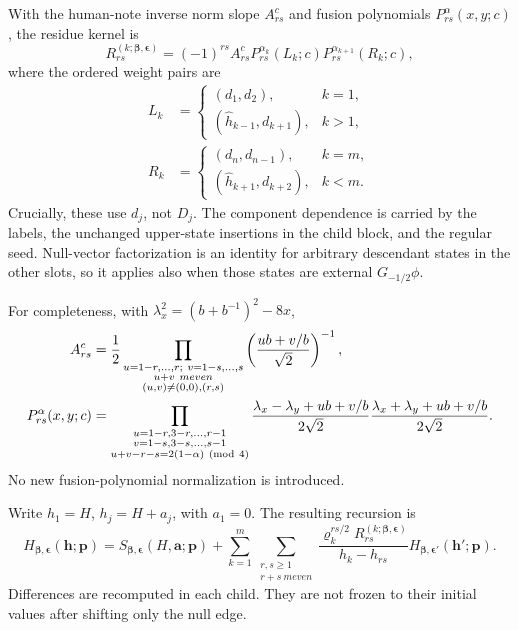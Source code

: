 \documentclass[11pt]{article}
\newcommand{\eps}{\boldsymbol\epsilon}
\newcommand{\bet}{\boldsymbol\beta}
\newcommand{\hp}{\boldsymbol h}
\newcommand{\pp}{\boldsymbol p}
\begin{document}
With the human-note inverse norm slope $A_{rs}^c$ and fusion
polynomials $P_{rs}^{\alpha}(x,y;c)$, the residue kernel is
\begin{equation}\label{eq:R}
 R_{rs}^{(k;\bet,\eps)}
 =(-1)^{rs}A_{rs}^c
 P_{rs}^{\alpha_k}(L_k;c)P_{rs}^{\alpha_{k+1}}(R_k;c),
\end{equation}
where the ordered weight pairs are
\begin{align}
 L_k&=\begin{cases}(d_1,d_2),&k=1,\\
              (\widehat h_{k-1},d_{k+1}),&k>1,
       \end{cases}\\
 R_k&=\begin{cases}(d_n,d_{n-1}),&k=m,\\
              (\widehat h_{k+1},d_{k+2}),&k<m.
       \end{cases}
\end{align}
Crucially, these use $d_j$, not $D_j$.  The component dependence is
carried by the labels, the unchanged upper-state insertions in the child
block, and the regular seed.  Null-vector factorization is an identity
for arbitrary descendant states in the other slots, so it applies also
when those states are external $G_{-1/2}\phi$.

For completeness, with $\lambda_x^2=(b+b^{-1})^2-8x$,
\begin{align}
 A_{rs}^c&=\frac12
  \prod_{\substack{u=1-r,\ldots,r;\ v=1-s,\ldots,s\\u+v\ {
m even}\\
                    (u,v)\ne(0,0),(r,s)}}
           \left(\frac{ub+v/b}{\sqrt2}\right)^{-1},\\
 P_{rs}^{\alpha}(x,y;c)&=
  \prod_{\substack{u=1-r,3-r,\ldots,r-1\\v=1-s,3-s,\ldots,s-1\\
             u+v-r-s=2(1-\alpha)\ ({\rm mod}\ 4)}}
   \frac{\lambda_x-\lambda_y+ub+v/b}{2\sqrt2}
   \frac{\lambda_x+\lambda_y+ub+v/b}{2\sqrt2}.
\end{align}
No new fusion-polynomial normalization is introduced.

Write $h_1=H$, $h_j=H+a_j$, with $a_1=0$.  The resulting recursion is
\begin{equation}\label{eq:recursion}
 \boxed{\displaystyle
 H_{\bet,\eps}(\hp;\pp)
 =S_{\bet,\eps}(H,\boldsymbol a;\pp)
 +\sum_{k=1}^m\sum_{\substack{r,s\ge1\\r+s\ {
m even}}}
   \frac{\varrho_k^{rs/2} R_{rs}^{(k;\bet,\eps)}}{h_k-h_{rs}}
   H_{\bet,\eps'}(\hp';\pp).}
\end{equation}
Differences are recomputed in each child.  They are not frozen to their
initial values after shifting only the null edge.
\end{document}

